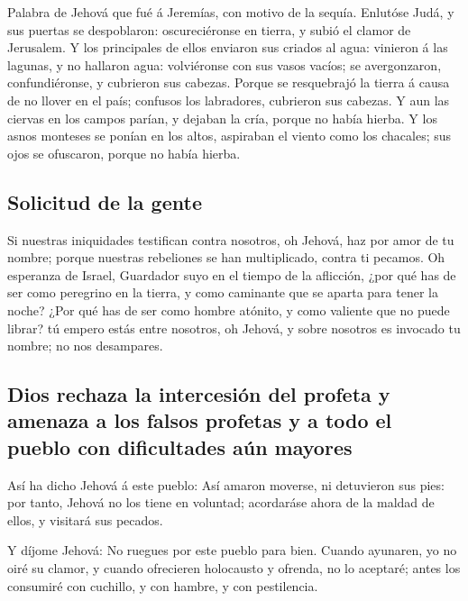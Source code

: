  Palabra de Jehová que fué á Jeremías, con motivo de la
sequía.  Enlutóse Judá, y sus puertas se despoblaron:
oscureciéronse en tierra, y subió el clamor de Jerusalem. 
Y los principales de ellos enviaron sus criados al agua: vinieron á las
lagunas, y no hallaron agua: volviéronse con sus vasos vacíos; se
avergonzaron, confundiéronse, y cubrieron sus cabezas. 
Porque se resquebrajó la tierra á causa de no llover en el país;
confusos los labradores, cubrieron sus cabezas.  Y aun las
ciervas en los campos parían, y dejaban la cría, porque no había hierba.
 Y los asnos monteses se ponían en los altos, aspiraban el
viento como los chacales; sus ojos se ofuscaron, porque no había hierba.

\hypertarget{solicitud-de-la-gente}{%
\subsection{Solicitud de la gente}\label{solicitud-de-la-gente}}

 Si nuestras iniquidades testifican contra nosotros, oh
Jehová, haz por amor de tu nombre; porque nuestras rebeliones se han
multiplicado, contra ti pecamos.  Oh esperanza de Israel,
Guardador suyo en el tiempo de la aflicción, ¿por qué has de ser como
peregrino en la tierra, y como caminante que se aparta para tener la
noche?  ¿Por qué has de ser como hombre atónito, y como
valiente que no puede librar? tú empero estás entre nosotros, oh Jehová,
y sobre nosotros es invocado tu nombre; no nos desampares.

\hypertarget{dios-rechaza-la-intercesiuxf3n-del-profeta-y-amenaza-a-los-falsos-profetas-y-a-todo-el-pueblo-con-dificultades-auxfan-mayores}{%
\subsection{Dios rechaza la intercesión del profeta y amenaza a los
falsos profetas y a todo el pueblo con dificultades aún
mayores}\label{dios-rechaza-la-intercesiuxf3n-del-profeta-y-amenaza-a-los-falsos-profetas-y-a-todo-el-pueblo-con-dificultades-auxfan-mayores}}

 Así ha dicho Jehová á este pueblo: Así amaron moverse,
ni detuvieron sus pies: por tanto, Jehová no los tiene en voluntad;
acordaráse ahora de la maldad de ellos, y visitará sus pecados.

 Y díjome Jehová: No ruegues por este pueblo para bien.
 Cuando ayunaren, yo no oiré su clamor, y cuando
ofrecieren holocausto y ofrenda, no lo aceptaré; antes los consumiré con
cuchillo, y con hambre, y con pestilencia.


